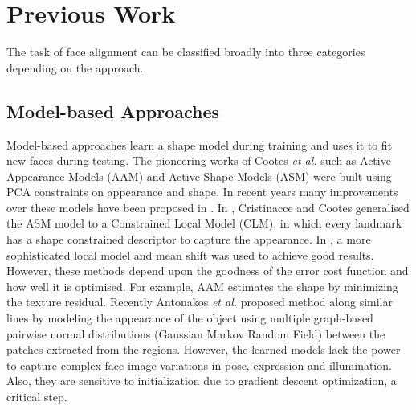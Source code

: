 \documentclass[10pt,twocolumn,letterpaper]{article}
\begin{document}
\section{Previous Work}
\label{prev_work}
The task of face alignment can be classified broadly into three categories depending on the approach.
\subsection{Model-based Approaches}
Model-based approaches learn a shape model during training and uses it to fit new faces during testing. The pioneering works of Cootes \textit{et al.} such as Active Appearance Models (AAM) \cite{AAM} and Active Shape Models (ASM) \cite{Cootes:1995:ASM:206543.206547} were built using PCA constraints on appearance and shape. In recent years many improvements over these models have been proposed in \cite{Matthews:2004:AAM:993451.996344,conf/eccv/LiangXWS08,Gross:2005:GVP:1709142.1709186,Gross:2006:AAM:1709247.1709267,Sauer11accurateregression,doi:10.5244/C.24.91}.  In \cite{Cristinacce06featuredetection}, Cristinacce and Cootes generalised the ASM model to a Constrained Local Model (CLM), in which every landmark has a shape constrained descriptor to capture the appearance. In \cite{Saragih:2011:DMF:1937966.1938021}, a more sophisticated local model and mean shift was used to achieve good results. However, these methods depend upon the goodness of the error cost function and how well it is optimised. For example, AAM estimates the shape by minimizing the texture residual. Recently Antonakos \textit{et al.} \cite{Antonakos_2015_CVPR} proposed method along similar lines by modeling the appearance of the object using multiple graph-based pairwise normal distributions (Gaussian Markov Random Field) between the
patches extracted from the regions. However, the learned models lack the power to capture complex face image variations in pose, expression and illumination. Also, they are sensitive to initialization due to gradient descent optimization, a critical step.
\end{document}
